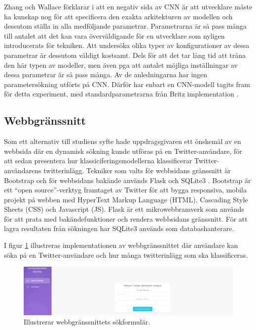 \documentclass{kaumasters} %
\begin{document}
Zhang och Wallace förklarar i \cite{cnn:002} att en negativ sida av CNN är att utvecklare måste ha kunskap nog för att specificera den exakta arkitekturen av modellen och dessutom ställa in alla medföljande parametrar. Parametrarna är så pass många till antalet att det kan vara överväldigande för en utvecklare som nyligen introducerats för tekniken. Att undersöka olika typer av konfigurationer av dessa parametrar är dessutom väldigt kostsamt. Dels för att det tar lång tid att träna den här typen av modeller, men även pga att antalet möjliga inställningar av dessa parametrar är så pass många. Av de anledningarna har ingen parametersökning utförts på CNN. Därför har enbart en CNN-modell tagits fram för detta experiment, med standardparametrarna från Britz implementation \cite{impcnn:002}.






\subsection{Webbgränssnitt}
Som ett alternativ till studiens syfte hade uppdragsgivaren ett önskemål av en webbsida där en dynamisk sökning kunde utföras på en Twitter-användare, för att sedan presentera hur klassiciferingsmodellerna klassificerar Twitter-användarens twitterinlägg.
Tekniker som valts för webbsidans gränssnitt är Bootstrap \cite{gui:001} och för webbsidans bakände används Flask \cite{gui:002} och SQLite3 \cite{gui:003}.
Bootstrap är ett “open source”-verktyg framtaget av Twitter för att bygga responsiva, mobila projekt på webben med HyperText Markup Language (HTML), Cascading Style Sheets (CSS) och Javascript (JS). Flask är ett mikrowebbramverk som används för att prata med bakändefunktioner och rendera webbsidans gränssnitt. För att lagra resultaten från sökningen har SQLite3 används som databashanterare.

I figur \ref{fig:gui_form} illustreras implementationen av webbgränssnittet där användare kan söka på en Twitter-användare och hur många twitterinlägg som ska klassificeras.

\begin{figure}[H]
\includegraphics[width=12cm]{GUI_form}
\centering
\caption{Illustrerar webbgränssnittets sökformulär.}
\label{fig:gui_form}
\end{figure}
\end{document}
